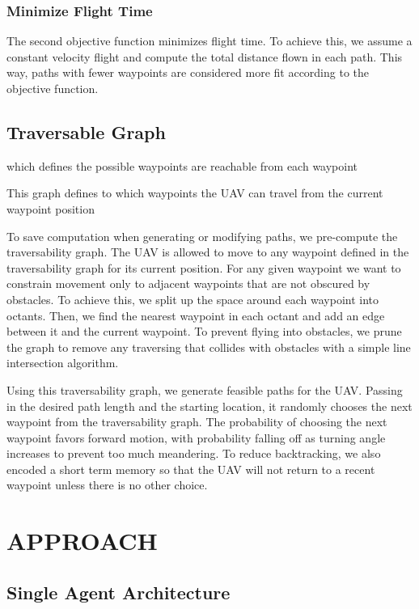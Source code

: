 \documentclass[letterpaper, 10 pt, conference]{ieeeconf}  %
\begin{document}
\subsubsection{Minimize Flight Time}

The second objective function minimizes flight time. To achieve this, we assume a constant velocity flight and compute the total distance flown in each path. This way, paths with fewer waypoints are considered more fit according to the objective function.

\subsection{Traversable Graph}

which defines the possible waypoints are reachable from each waypoint

This graph defines to which waypoints the UAV can travel from the current waypoint position

To save computation when generating or modifying paths, we pre-compute the traversability graph. The UAV is allowed to move to any waypoint defined in the traversability graph for its current position. For any given waypoint we want to constrain movement only to adjacent waypoints that are not obscured by obstacles. To achieve this, we split up the space around each waypoint into octants. Then, we find the nearest waypoint in each octant and add an edge between it and the current waypoint. To prevent flying into obstacles, we prune the graph to remove any traversing that collides with obstacles with a simple line intersection algorithm.

Using this traversability graph, we generate feasible paths for the UAV. Passing in the desired path length and the starting location, it randomly chooses the next waypoint from the traversability graph. The probability of choosing the next waypoint favors forward motion, with probability falling off as turning angle increases to prevent too much meandering. To reduce backtracking, we also encoded a short term memory so that the UAV will not return to a recent waypoint unless there is no other choice.

\section{APPROACH}\label{approach}
\subsection{Single Agent Architecture}
\end{document}
